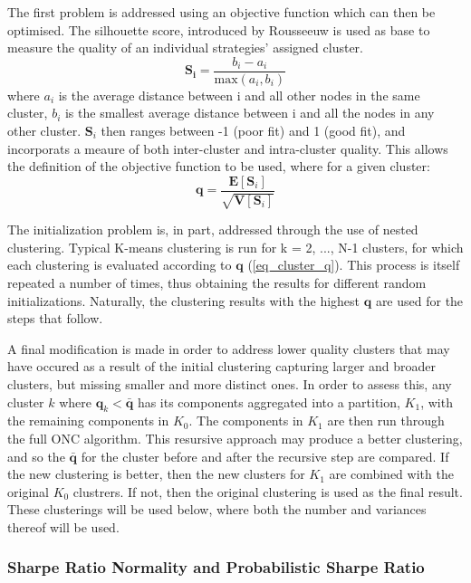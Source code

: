\documentclass[a4paper,11pt,oneside]{article}
\theoremstyle{plain}
\theoremstyle{definition}
\begin{document}
	The first problem is addressed using an objective function which can then be optimised. The silhouette score, introduced by Rousseeuw \cite{Rousseeouw1987} is used as base to measure the quality of an individual strategies' assigned cluster.
	\begin{equation}\label{eq_silhouette}
	\mathbf{S_i} = \frac{b_i - a_i}{\mathrm{max}\left(a_i, b_i\right)}
	\end{equation}
	where $a_i$ is the average distance between i and all other nodes in the same cluster, $b_i$ is the smallest average distance between i and all the nodes in any other cluster. $\mathbf{S}_i$ then ranges between -1 (poor fit) and 1 (good fit), and incorporats a meaure of both inter-cluster and intra-cluster quality. This allows the definition of the objective function to be used, where for a given cluster:
	\begin{equation}\label{eq_cluster_q}
	\mathbf{q} = \frac{\mathbf{E}[{\mathbf{S}_i}]}{\sqrt{\mathbf{V}[{\mathbf{S}_i}]}}
	\end{equation} 
	
	The initialization problem is, in part, addressed through the use of nested clustering. Typical K-means clustering is run for k = 2, ..., N-1 clusters, for which each clustering is evaluated according to $\mathbf{q}$ (\ref{eq_cluster_q}). This process is itself repeated a number of times, thus obtaining the results for different random initializations. Naturally, the clustering results with the highest $\mathbf{q}$ are used for the steps that follow. \newline
	
	A final modification is made in order to address lower quality clusters that may have occured as a result of the initial clustering capturing larger and broader clusters, but missing smaller and more distinct ones. In order to assess this, any cluster $k$ where $\mathbf{q}_k < \mathbf{\bar{q}}$ has its components aggregated into a partition, $K_1$, with the remaining components in $K_0$. The components in $K_1$ are then run through the full ONC algorithm. This resursive approach may produce a better clustering, and so the  $\mathbf{\bar{q}}$  for the cluster before and after the recursive step are compared. If the new clustering is better, then the new clusters for $K_1$ are combined with the original $K_0$ clustrers. If not, then the original clustering is used as the final result. These clusterings will be used below, where both the number and variances thereof will be used.
	
	\subsubsection{Sharpe Ratio Normality and Probabilistic Sharpe Ratio}\label{sr_normality}
	
\end{document}
